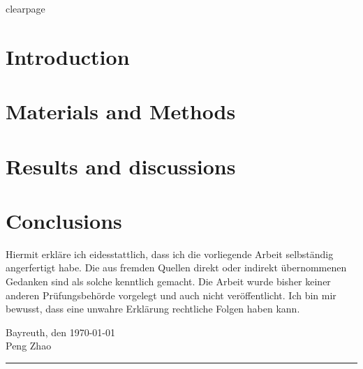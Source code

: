 clearpage

\clearpage
\chapter{Introduction} %
\chapter{Materials and Methods}
\chapter{Results and discussions}
\chapter{Conclusions}
	

\newpage
{}
\appendix
\makeatletter {} \makeatother
\makeatletter {} \makeatother
\renewcommand*{\thechapter}{\Alph{section}}
\renewcommand\thefigure{\Alph{section}.\arabic{figure}}
\renewcommand\thetable{\Alph{section}.\arabic{table}}



\vspace{5em}
\noindent
Hiermit erkl\"{a}re ich eidesstattlich, dass ich die vorliegende Arbeit selbst\"{a}ndig angerfertigt habe. Die aus fremden Quellen direkt oder indirekt \"{u}bernommenen Gedanken sind als solche kenntlich gemacht. Die Arbeit wurde bisher keiner anderen Pr\"{u}fungsbeh\"{o}rde vorgelegt und auch nicht ver\"{o}ffentlicht.  Ich bin mir bewusst, dass eine unwahre Erkl\"{a}rung rechtliche Folgen haben kann.

\vspace{7em}
\noindent
Bayreuth, den \today
\\[2em]
Peng Zhao
\noindent
\rule[-0.1cm]{5cm}{0.01cm}\\
